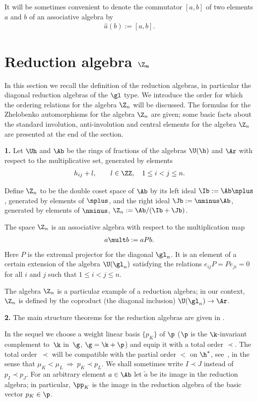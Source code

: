 It will be sometimes convenient to denote the commutator $[a,b]$ of two elements $a$ and $b$ of an associative algebra by
\begin{gather}
 \hat{a}(b):=[a,b] .\label{dehaco}
\end{gather}


\section[Reduction algebra $\Z_n$]{Reduction algebra $\boldsymbol{\Z_n}$}\label{section2}

In this section we recall the def\/inition of the reduction algebras, in particular the diagonal reduction algebras of the $\gl$ type.
We introduce the order for which
the ordering relations for the algebra $\Z_n$ will be discussed.
The formulas for the Zhelobenko automorphisms for the algebra $\Z_n$ are given; some basic facts about the standard involution, anti-involution
and central elements for the algebra $\Z_n$ are presented at the end of the section.

{\bf 1.} Let $\Uh$ and $\Ab$ be the rings of fractions of the algebras $\U(\h)$ and $\Ar$ with respect to the multiplicative set, generated by elements
\begin{gather*}
 h_{ij}+l ,\qquad l\in\ZZ  , \quad 1\leq i<j\leq n  .%
 \end{gather*}


Def\/ine $\Z_n$ to be the double coset space of $\Ab$ by its left ideal $\Ib:=\Ab\nplus$, generated by elements of $\nplus$, and the right ideal
$\Jb:=\nminus\Ab$, generated by elements of $\nminus$, $\Z_n:=\Ab/(\Ib+\Jb)$.


The space $\Z_n$ is an associative algebra with respect to the multiplication map
\begin{gather}
\label{not5a}
a\mult b:=aP b  .
\end{gather}
Here $P$ is the extremal projector \cite{AST} for the diagonal $\gl_n$.
It is an element of a certain extension of the algebra $\U(\gl_n)$ satisfying the relations $e_{ij}P=Pe_{ji}=0$ for all $i$ and
$j$ such that $1\leq i<j\leq n$.


The algebra  $\Z_n$ is a particular example of a reduction algebra; in our context, $\Z_n$ is
def\/ined by the coproduct (the diagonal inclusion) $\U(\gl_n)\to\Ar$.

{\bf 2.}  The main structure theorems for the reduction algebras are given in \cite[Section~2]{KO3}.


In the sequel we choose a weight linear basis $\{p_K\}$ of $\p$ ($\p$ is the $\k$-invariant complement to~$\k$ in~$\g$,
$\g =\k +\p$) and equip it with a total order $\prec$. The total order~$\prec$ will be compatible with the partial order $<$ on
$\h^*$, see~, in the sense that $\mu_K<\mu_L\ \Rightarrow \ p_K\prec p_L$. We shall sometimes write
$I\prec J$ instead of $p_I\prec p_J$. For an arbitrary element $a\in\Ab$ let $\widetilde{a}$ be its image in the reduction
algebra; in particular, $\pp_K$ is the image in the reduction algebra of the basic vector $p_K\in\p$.

